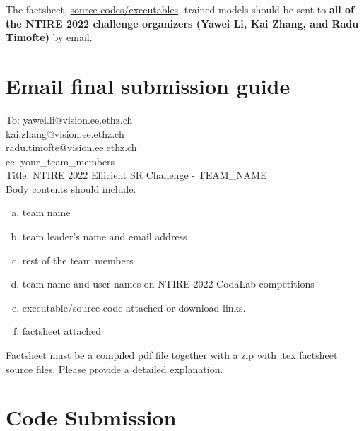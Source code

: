 \documentclass[10pt,twocolumn,letterpaper]{article}
\begin{document}
The factsheet, \href{https://github.com/ofsoundof/IMDN}{source codes/executables}, trained models should be sent to \textbf{all of the NTIRE 2022 challenge organizers (Yawei Li, Kai Zhang, and Radu Timofte)} by email.

\section{Email final submission guide}

\noindent To: {yawei.li@vision.ee.ethz.ch} \\ {kai.zhang@vision.ee.ethz.ch} \\ {radu.timofte@vision.ee.ethz.ch}\\
\noindent cc: your\_team\_members\\
Title: NTIRE 2022 Efficient SR Challenge - TEAM\_NAME\\

Body contents should include: 

\begin{enumerate}[a)]
\item team name 

\item team leader's name and email address 

\item rest of the team members 

\item team name and user names on NTIRE 2022 CodaLab competitions 

\item executable/source code attached or download links. 

\item factsheet attached 
\end{enumerate}



\noindent Factsheet must be a compiled pdf file together with a zip with .tex factsheet source files. Please provide a detailed explanation.


\section{Code Submission}
\end{document}
